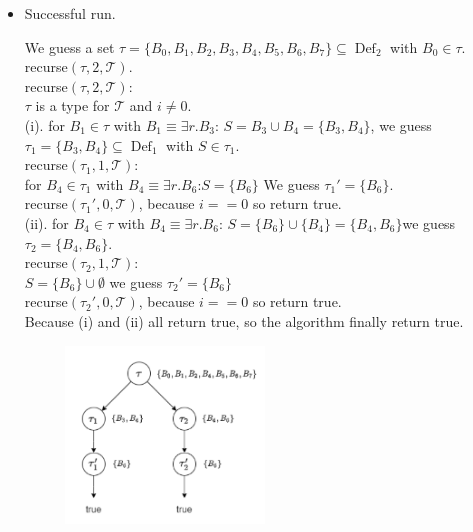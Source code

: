 \documentclass[12pt]{article}
\begin{document}
    \begin{itemize}
        \item Successful run. \par
        We guess a set $\tau = \{ B_0, B_1, B_2,B_3, B_4, B_5, B_6, B_7 \}\subseteq \operatorname{Def}_2$ with $B_0 \in \tau$. \\
        recurse$(\tau, 2, \mathcal{T})$. \\
        recurse$(\tau, 2, \mathcal{T})$: \\
        $\tau$ is a type for $\mathcal{T}$ and $i \neq 0$. \\
        (i). for $B_1 \in \tau$ with $B_1 \equiv \exists r.B_3$: $S = { B_3 } \cup { B_4 } = \{ B_3, B_4 \}$, we guess $\tau_1 = \{B_3, B_4\} \subseteq \operatorname{Def}_1$ with $S \in \tau_1$. \\
        recurse$(\tau_1, 1, \mathcal{T})$: \\
        for $B_4 \in \tau_1$ with $B_4 \equiv \exists r.B_6$:$S = \{ B_6 \} $
        We guess $\tau_1' = \{B_6 \}$.\\
        recurse$(\tau_1', 0, \mathcal{T})$, because $i == 0$ so return true. \\
        (ii). for $B_4 \in \tau$ with $B_4 \equiv \exists r.B_6$:
        $S = \{ B_6 \} \cup \{ B_4 \} = \{ B_4, B_6 \}$we guess $\tau_2 = \{ B_4, B_6 \}$. \\
        recurse$(\tau_2, 1, \mathcal{T})$: \\$S = \{ B_6 \} \cup \emptyset$ we guess $\tau_2' = \{ B_6 \}$\\ 
        recurse$(\tau_2', 0, \mathcal{T})$, because $i == 0$ so return true. \\
        Because (i) and (ii) all return true, so the algorithm finally return true.\\
        \begin{figure}[htbp]
            \centering 
            \includegraphics[width=0.5\textwidth,height=0.5\textwidth]{successful.png}

\end{figure}
\end{itemize}
\end{document}
